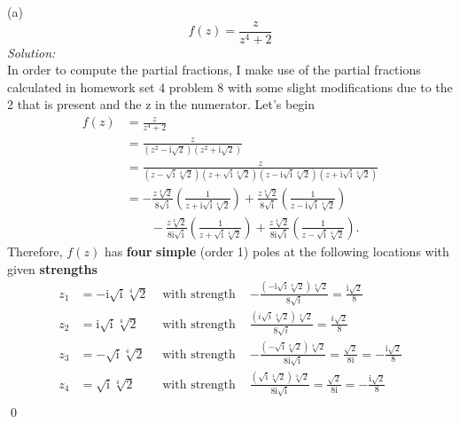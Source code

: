 \documentclass[10pt]{amsart}
\newcommand{\I}{\mathrm{i}}
\theoremstyle{nonumberplain}
\begin{document}
\begin{enumerate}[label={\bf {\arabic*}:}]
\noindent
(a)
$$
f(z) = \frac z {z^4 + 2}
$$
\textit{Solution:} \\
In order to compute the partial fractions, I make use of the partial fractions calculated in homework set 4 problem 8 with some slight modifications due to the 2 that is present and the z in the numerator.
Let's begin
\begin{align*}
f(z) &= \frac z {z^4 + 2} \\
	&= \frac z {(z^2 - \I\sqrt{2})(z^2 + \I\sqrt{2})} \\
	&= \frac z {
		(z - \sqrt{\I}\sqrt[4]{2})
		(z + \sqrt{\I}\sqrt[4]{2})
		(z - \I\sqrt{\I}\sqrt[4]{2})
		(z + \I\sqrt{\I}\sqrt[4]{2})
	} \\
	&= - \frac {z \sqrt[4]2} {8\sqrt{\I}} \left( \frac{1}{z + \I\sqrt{\I} \sqrt[4]{2}} \right)
		+ \frac {z \sqrt[4]2} {8\sqrt{\I}} \left(\frac{1}{z - \I\sqrt{\I} \sqrt[4]{2}} \right) \\
		& \quad \quad - \frac {z \sqrt[4]2} {8\I\sqrt{\I}} \left( \frac{1}{z + \sqrt{\I} \sqrt[4]{2}} \right)
		+ \frac {z \sqrt[4]2} {8\I\sqrt{\I}} \left( \frac{1}{z - \sqrt{\I} \sqrt[4]{2}} \right).
\end{align*}
Therefore, $f(z)$ has { \bf four}  { \bf simple } (order 1) poles at the following locations with given { \bf strengths }
\begin{align*}
z_1 &= - \I\sqrt{\I} \sqrt[4]{2}
	& \text{ with strength }
	& - \frac {\left( - \I\sqrt{\I} \sqrt[4]{2} \right) \sqrt[4]2} {8\sqrt{\I}}
		= \frac {\I \sqrt{2} } {8} \\
z_2 &= \I\sqrt{\I} \sqrt[4]{2}
	& \text{ with strength }
	& \frac {\left( i\sqrt{i} \sqrt[4]{2} \right) \sqrt[4]2} {8\sqrt{i}}
		= \frac {i \sqrt{2} } {8} \\
z_3 &= - \sqrt{\I} \sqrt[4]{2}
	& \text{ with strength }
	& - \frac {\left(- \sqrt{\I} \sqrt[4]{2} \right) \sqrt[4]2} {8 \I\sqrt{\I}}
		= \frac {\sqrt{2} } {8 \I} 
		= - \frac { \I \sqrt{2} } {8} \\
z_4 &= \sqrt{\I} \sqrt[4]{2}
	& \text{ with strength }
	& \frac {\left(\sqrt{\I} \sqrt[4]{2} \right) \sqrt[4]2} {8 \I \sqrt{\I}}
		= \frac {\sqrt{2} } {8 \I} 
		= - \frac { \I \sqrt{2} } {8} \\
\end{align*} \qed \\
\newpage


\end{enumerate}
\end{document}
